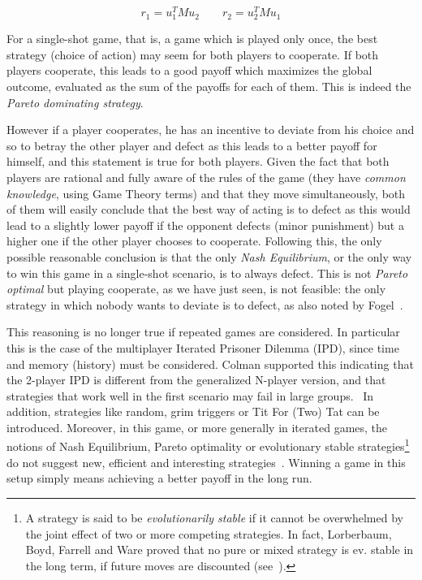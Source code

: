 \documentclass[journal,a4paper,10pt,twoside]{IEEEtran} %
\begin{document}
$$
r_1 = u_1^T M u_2
\quad
\quad
r_2 = u_2^T M u_1
$$

For a single-shot game, that is, a game which is played only once, the best strategy (choice of action) may seem for both players to cooperate. If both players cooperate, this leads to a good payoff which maximizes the global outcome, evaluated as the sum of the payoffs for each of them. This is indeed the \textit{Pareto dominating strategy}.

However if a player cooperates, he has an incentive to deviate from his choice and so to betray the other player and defect as this leads to a better payoff for himself, and this statement is true for both players. 
Given the fact that both players are rational and fully aware of the rules of the game (they have \textit{common knowledge}, using Game Theory terms) and that they move simultaneously, both of them will easily conclude that the best way of acting is to defect as this would lead to a slightly lower payoff if the opponent defects (minor punishment) but a higher one if the other player chooses to cooperate.
Following this, the only possible reasonable conclusion is that the only \textit{Nash Equilibrium}, or the only way to win this game in a single-shot scenario, is to always defect.
This is not \textit{Pareto optimal} but playing cooperate, as we have just seen, is not feasible: the only strategy in which nobody wants to deviate is to defect, as also noted by Fogel~\cite{fogelEvolvingBehaviors}.

This reasoning is no longer true if repeated games are considered. In particular this is the case of the multiplayer Iterated Prisoner Dilemma (IPD), since time and memory (history) must be considered.
Colman supported this indicating that the 2-player IPD is different from the generalized N-player version, and that strategies that work well in the first scenario may fail in large groups.~\cite{yao1994experimental}
In addition, strategies like random, grim triggers or Tit For (Two) Tat can be introduced.
Moreover, in this game, or more generally in iterated games, the notions of Nash Equilibrium, Pareto optimality or evolutionary stable strategies\footnote{A strategy is said to be \textit{evolutionarily stable} if it cannot be overwhelmed by the joint effect of two or more competing strategies. In fact, Lorberbaum, Boyd, Farrell and Ware proved that no pure or mixed strategy is ev. stable in the long term, if future moves are discounted (see~\cite{lorb94}).} do not suggest new, efficient and interesting strategies~\cite{mathieu2017}.
Winning a game in this setup simply means achieving a better payoff in the long run.
\end{document}
